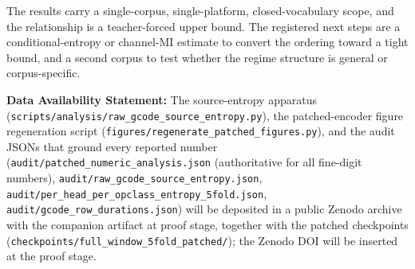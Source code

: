 \documentclass[entropy,article,submit,moreauthors,pdftex]{Definitions/mdpi}
\providecommand{\dataavailability}[1]{\medskip\noindent\textbf{Data Availability Statement:} #1\par}
\begin{document}
The results carry a single-corpus, single-platform, closed-vocabulary scope, and the relationship is a teacher-forced upper bound. The registered next steps are a conditional-entropy or channel-MI estimate to convert the ordering toward a tight bound, and a second corpus to test whether the regime structure is general or corpus-specific.

\vspace{6pt}


\dataavailability{The source-entropy apparatus (\texttt{scripts/\allowbreak analysis/\allowbreak raw\_gcode\_source\_entropy.py}), the patched-encoder figure regeneration script (\texttt{figures/\allowbreak regenerate\_patched\_figures.py}), and the audit JSONs that ground every reported number (\texttt{audit/\allowbreak patched\_numeric\_analysis.json} (authoritative for all fine-digit numbers), \texttt{audit/\allowbreak raw\_gcode\_source\_entropy.json}, \texttt{audit/\allowbreak per\_head\_per\_opclass\_entropy\_5fold.json}, \texttt{audit/\allowbreak gcode\_row\_durations.json}) will be deposited in a public Zenodo archive with the companion artifact at proof stage, together with the patched checkpoints (\texttt{checkpoints/\allowbreak full\_window\_5fold\_patched/}); the Zenodo DOI will be inserted at the proof stage.}



\end{document}
